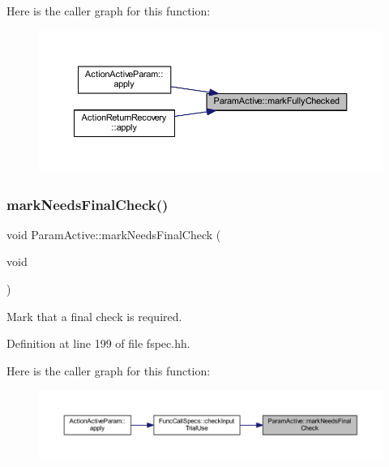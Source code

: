 Here is the caller graph for this function\+:
\nopagebreak
\begin{figure}[H]
\begin{center}
\leavevmode
\includegraphics[width=350pt]{class_param_active_a139fd20617eb3a88e32bc960e03b9ad1_icgraph}
\end{center}
\end{figure}
\mbox{\label{class_param_active_a7cf85723002b79c4500f3eba9159b7fa}} 
\subsubsection{\texorpdfstring{markNeedsFinalCheck()}{markNeedsFinalCheck()}}
{\footnotesize\ttfamily void Param\+Active\+::mark\+Needs\+Final\+Check (\begin{DoxyParamCaption}\item[{void}]{ }\end{DoxyParamCaption})\hspace{0.3cm}{\ttfamily [inline]}}



Mark that a final check is required. 



Definition at line 199 of file fspec.\+hh.

Here is the caller graph for this function\+:
\nopagebreak
\begin{figure}[H]
\begin{center}
\leavevmode
\includegraphics[width=350pt]{class_param_active_a7cf85723002b79c4500f3eba9159b7fa_icgraph}
\end{center}
\end{figure}
\mbox{\label{class_param_active_a3b308bb5dafd2bafc5e425991deab476}} 
